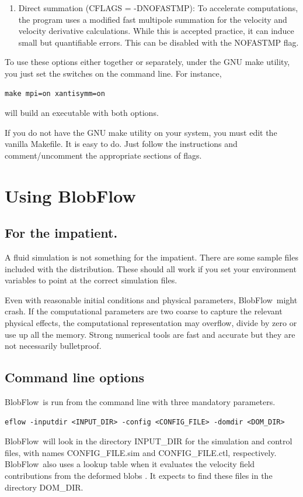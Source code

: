 \documentclass[12pt]{report}
\newcommand{\BF}{BlobFlow}
\begin{document}
\begin{enumerate}
\item Direct summation (CFLAGS = -DNOFASTMP):  To accelerate computations, the
program uses a modified fast multipole summation for the velocity and velocity
derivative calculations.  While this is accepted practice, it can induce
small but quantifiable errors.  This can be disabled with the NOFASTMP flag.

\end{enumerate}

To use these options either together or separately, under the GNU make
utility, you just set the switches on the command line. For instance,
\begin{verbatim}
make mpi=on xantisymm=on
\end{verbatim}
will build an executable with both options.

If you do not have the GNU make utility on your system, you must edit the
vanilla Makefile.  It is easy to do.  Just follow the instructions and
comment/uncomment the appropriate sections of flags.

\chapter{Using \BF}

\section{For the impatient.}

A fluid simulation is not something for the impatient.  There are some
sample files included with the distribution.  These should all work if you
set your environment variables to point at the correct simulation files.

Even with reasonable initial conditions and physical
parameters,
\BF~might crash.  If the computational parameters
are two coarse to capture the relevant physical effects, the computational
representation may overflow, divide by zero or use up all the memory.
Strong numerical tools are fast and accurate but they are not necessarily 
bulletproof.

\section{Command line options}

\BF~is run from the command line with three mandatory parameters.
\begin{verbatim}
eflow -inputdir <INPUT_DIR> -config <CONFIG_FILE> -domdir <DOM_DIR>
\end{verbatim}
\BF~will look in the directory INPUT\_DIR for the simulation and control files,
with names CONFIG\_FILE.sim and CONFIG\_FILE.ctl, respectively.  \BF~also uses a
lookup table when it evaluates the velocity field contributions from the
deformed blobs \cite{platte-rossi-mitchell}.  It expects to find these files in
the directory DOM\_DIR.
\end{document}
